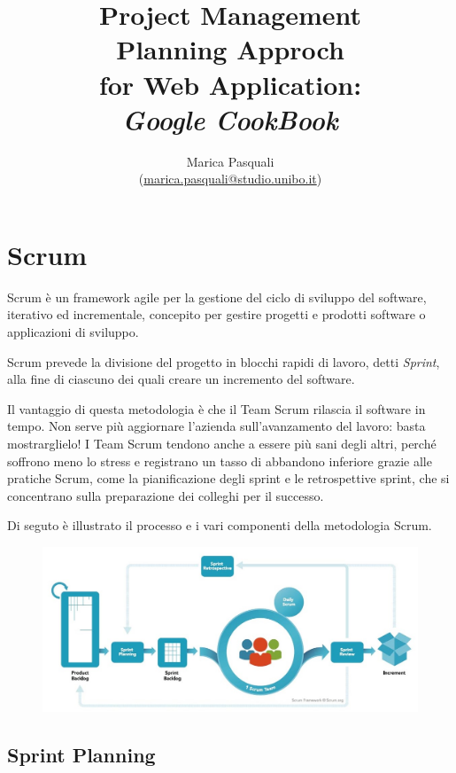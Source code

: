 \documentclass{article}
\title{
    Project Management \\
    \textbf{ 
        Planning Approch \\
        for Web Application: \\
        \textit{Google CookBook}
    }
}
\author{
    Marica Pasquali \\ 
    (\href{mailto:marica.pasquali@studio.unibo.it}{marica.pasquali@studio.unibo.it})
}
\begin{document}
\maketitle 
\newpage
\tableofcontents 
\newpage

\section{Scrum}

Scrum è un framework agile per la gestione del ciclo di sviluppo del software, iterativo ed incrementale, concepito 
per gestire progetti e prodotti software o applicazioni di sviluppo.

Scrum prevede la divisione del progetto in blocchi rapidi di lavoro, detti \textit{Sprint}, alla fine di ciascuno 
dei quali creare un incremento del software. 

Il vantaggio di questa metodologia è che il Team Scrum rilascia il software in tempo. 
Non serve più aggiornare l'azienda sull'avanzamento del lavoro: basta mostrarglielo! 
I Team Scrum tendono anche a essere più sani degli altri, perché soffrono meno lo stress e registrano 
un tasso di abbandono inferiore grazie alle pratiche Scrum, come la pianificazione degli sprint e le retrospettive 
sprint, che si concentrano sulla preparazione dei colleghi per il successo.


Di seguto è illustrato il processo e i vari componenti della metodologia Scrum.

\begin{figure}[h]
    \centering
    \includegraphics[width=\textwidth]{./imgs/scrum-process.jpg}
\end{figure}


\subsection{Sprint Planning}
\end{document}
